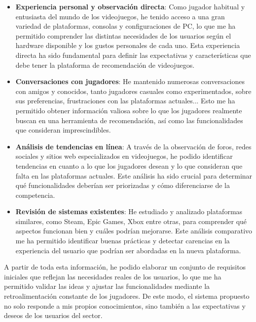 \begin{itemize}
    \item \textbf{Experiencia personal y observación directa}: Como jugador habitual y entusiasta del mundo de los videojuegos, he tenido acceso a una gran variedad de plataformas, consolas y configuraciones de PC, lo que me ha permitido comprender las distintas necesidades de los usuarios según el hardware disponible y los gustos personales de cada uno. Esta experiencia directa ha sido fundamental para definir las expectativas y características que debe tener la plataforma de recomendación de videojuegos.

    \item \textbf{Conversaciones con jugadores}: He mantenido numerosas conversaciones con amigos y conocidos, tanto jugadores casuales como experimentados, sobre sus preferencias, frustraciones con las plataformas actuales... Esto me ha permitido obtener información valiosa sobre lo que los jugadores realmente buscan en una herramienta de recomendación, así como las funcionalidades que consideran imprescindibles.

    \item \textbf{Análisis de tendencias en línea}: A través de la observación de foros, redes sociales y sitios web especializados en videojuegos, he podido identificar  tendencias en cuanto a lo que los jugadores desean y lo que consideran que falta en las plataformas actuales. Este análisis ha sido crucial para determinar qué funcionalidades deberían ser priorizadas y cómo diferenciarse de la competencia.

    \item \textbf{Revisión de sistemas existentes}: He estudiado y analizado plataformas similares, como Steam, Epic Games, Xbox entre otras, para comprender qué aspectos funcionan bien y cuáles podrían mejorarse. Este análisis comparativo me ha permitido identificar buenas prácticas y detectar carencias en la experiencia del usuario que podrían ser abordadas en la nueva plataforma.

\end{itemize}

A partir de toda esta información, he podido elaborar un conjunto de requisitos iniciales que reflejan las necesidades reales de los usuarios, lo que me ha permitido validar las ideas y ajustar las funcionalidades mediante la retroalimentación constante de los jugadores. De este modo, el sistema propuesto no solo responde a mis propios conocimientos, sino también a las expectativas y deseos de los usuarios del sector.

